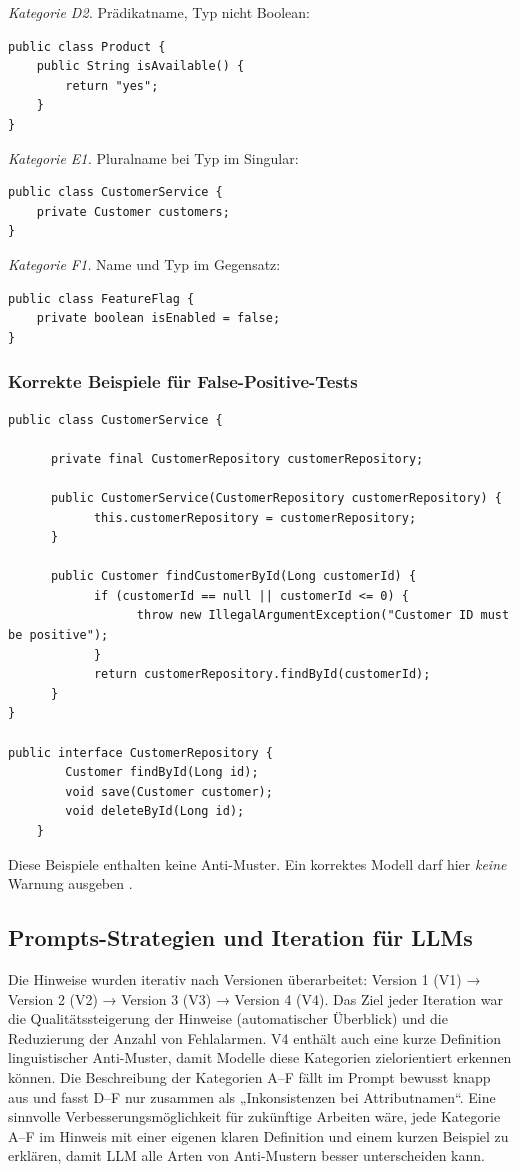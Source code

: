 \documentclass[a4paper,12pt]{article}
\begin{document}
\textit{Kategorie D2.} Prädikatname, Typ nicht Boolean:
\begin{lstlisting}
public class Product {
    public String isAvailable() {
        return "yes";
    }
}
\end{lstlisting}

\textit{Kategorie E1.} Pluralname bei Typ im Singular:
\begin{lstlisting}
public class CustomerService {
    private Customer customers;
}
\end{lstlisting}

\textit{Kategorie F1.} Name und Typ im Gegensatz:
\begin{lstlisting}
public class FeatureFlag {
    private boolean isEnabled = false;
}
\end{lstlisting}

\subsubsection{Korrekte Beispiele für False-Positive-Tests}

\begin{lstlisting}
public class CustomerService {

      private final CustomerRepository customerRepository;

      public CustomerService(CustomerRepository customerRepository) {
            this.customerRepository = customerRepository;
      }

      public Customer findCustomerById(Long customerId) {
            if (customerId == null || customerId <= 0) {
                  throw new IllegalArgumentException("Customer ID must be positive");
            }
            return customerRepository.findById(customerId);
      }
}

public interface CustomerRepository {
        Customer findById(Long id);
        void save(Customer customer);
        void deleteById(Long id);
    }

\end{lstlisting}

Diese Beispiele enthalten keine Anti-Muster. Ein korrektes Modell darf hier \emph{keine} Warnung ausgeben \cite{llmdetection2025}.

\subsection{Prompts-Strategien und Iteration für LLMs}
Die Hinweise wurden iterativ nach Versionen überarbeitet: Version 1 (V1) → Version 2 (V2) → Version 3 (V3) → Version 4 (V4). Das Ziel jeder Iteration war die Qualitätssteigerung der Hinweise (automatischer Überblick) und die Reduzierung der Anzahl von Fehlalarmen. V4 enthält auch eine kurze Definition linguistischer Anti-Muster, damit Modelle diese Kategorien zielorientiert erkennen können. Die Beschreibung der Kategorien A–F fällt im Prompt bewusst knapp aus und fasst D–F nur zusammen als „Inkonsistenzen bei Attributnamen“. Eine sinnvolle Verbesserungsmöglichkeit für zukünftige Arbeiten wäre, jede Kategorie A–F im Hinweis mit einer eigenen klaren Definition und einem kurzen Beispiel zu erklären, damit LLM alle Arten von Anti-Mustern besser unterscheiden kann.
\end{document}
